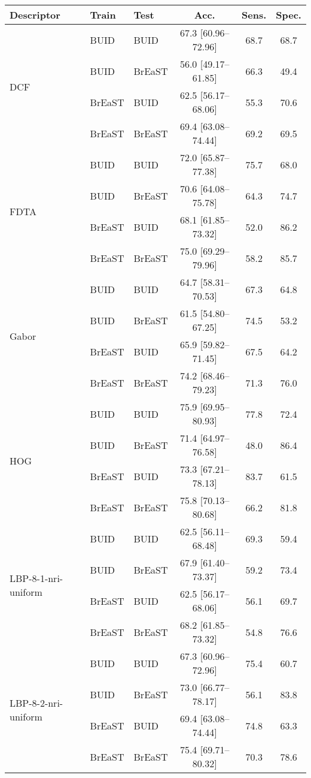 \begin{tabular}{lllccc}\\ 
\toprule
Descriptor & Train &Test & Acc. & Sens. &Spec.\\ 
\midrule
\multirow{4}{*}{DCF} & BUID & BUID & 67.3 [60.96--72.96] & 68.7 & 68.7\\ 
 & BUID & BrEaST & 56.0 [49.17--61.85] & 66.3 & 49.4\\ 
 & BrEaST & BUID & 62.5 [56.17--68.06] & 55.3 & 70.6\\ 
 & BrEaST & BrEaST & 69.4 [63.08--74.44] & 69.2 & 69.5\\ 
\midrule
\multirow{4}{*}{FDTA} & BUID & BUID & 72.0 [65.87--77.38] & 75.7 & 68.0\\ 
 & BUID & BrEaST & 70.6 [64.08--75.78] & 64.3 & 74.7\\ 
 & BrEaST & BUID & 68.1 [61.85--73.32] & 52.0 & 86.2\\ 
 & BrEaST & BrEaST & 75.0 [69.29--79.96] & 58.2 & 85.7\\ 
\midrule
\multirow{4}{*}{Gabor} & BUID & BUID & 64.7 [58.31--70.53] & 67.3 & 64.8\\ 
 & BUID & BrEaST & 61.5 [54.80--67.25] & 74.5 & 53.2\\ 
 & BrEaST & BUID & 65.9 [59.82--71.45] & 67.5 & 64.2\\ 
 & BrEaST & BrEaST & 74.2 [68.46--79.23] & 71.3 & 76.0\\ 
\midrule
\multirow{4}{*}{HOG} & BUID & BUID & 75.9 [69.95--80.93] & 77.8 & 72.4\\ 
 & BUID & BrEaST & 71.4 [64.97--76.58] & 48.0 & 86.4\\ 
 & BrEaST & BUID & 73.3 [67.21--78.13] & 83.7 & 61.5\\ 
 & BrEaST & BrEaST & 75.8 [70.13--80.68] & 66.2 & 81.8\\ 
\midrule
\multirow{4}{*}{LBP-8-1-nri-uniform} & BUID & BUID & 62.5 [56.11--68.48] & 69.3 & 59.4\\ 
 & BUID & BrEaST & 67.9 [61.40--73.37] & 59.2 & 73.4\\ 
 & BrEaST & BUID & 62.5 [56.17--68.06] & 56.1 & 69.7\\ 
 & BrEaST & BrEaST & 68.2 [61.85--73.32] & 54.8 & 76.6\\ 
\midrule
\multirow{4}{*}{LBP-8-2-nri-uniform} & BUID & BUID & 67.3 [60.96--72.96] & 75.4 & 60.7\\ 
 & BUID & BrEaST & 73.0 [66.77--78.17] & 56.1 & 83.8\\ 
 & BrEaST & BUID & 69.4 [63.08--74.44] & 74.8 & 63.3\\ 
 & BrEaST & BrEaST & 75.4 [69.71--80.32] & 70.3 & 78.6\\ 
\bottomrule
\end{tabular}
